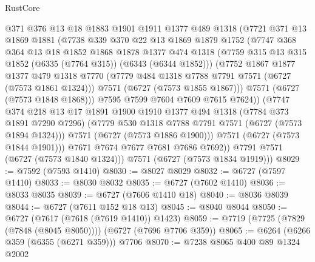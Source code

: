 \begin{lexlean}{RustCore}
\begin{coremodule}
              @371
              @376
              @13
              @18
              @1883
              @1901
              @1911
              @1377
              @489
              @1318
              (@7721
                @371
                @13
                @1869
                @1881
                (@7738
                  @339
                  @370
                  @22
                  @13
                  @1869
                  @1879
                  @1752
                  (@7747
                    @368
                    @364
                    @13
                    @18
                    @1852
                    @1868
                    @1878
                    @1377
                    @474
                    @1318
                    (@7759 @315 @13 @315 @1852 (@6335 (@7764 @315)) (@6343 (@6344 @1852)))
                    (@7752
                      @1867
                      @1877
                      @1377
                      @479
                      @1318
                      @7770
                      (@7779 @484 @1318 @7788 @7791 @7571 (@6727 (@7573 @1861 @1324)))
                      @7571
                      (@6727 (@7573 @1855 @1867)))
                    @7571
                    (@6727 (@7573 @1848 @1868)))
                  @7595
                  @7599
                  @7604
                  @7609
                  @7615
                  @7624))
              (@7747
                @374
                @218
                @13
                @17
                @1891
                @1900
                @1910
                @1377
                @494
                @1318
                (@7784 @373 @1891 @7290 @7296)
                (@7779 @530 @1318 @7788 @7791 @7571 (@6727 (@7573 @1894 @1324)))
                @7571
                (@6727 (@7573 @1886 @1900)))
              @7571
              (@6727 (@7573 @1844 @1901)))
            @7671
            @7674
            @7677
            @7681
            @7686
            @7692))
        @7791
        @7571
        (@6727 (@7573 @1840 @1324)))
      @7571
      (@6727 (@7573 @1834 @1919)))
@8029 := @7592 (@7593 @1410)
@8030 := @8027 @8029
@8032 := @6727 (@7597 @1410)
@8033 := @8030 @8032
@8035 := @6727 (@7602 @1410)
@8036 := @8033 @8035
@8039 := @6727 (@7606 @1410 @18)
@8040 := @8036 @8039
@8044 := @6727 (@7611 @152 @18 @13)
@8045 := @8040 @8044
@8050 := @6727 (@7617 (@7618 (@7619 @1410)) @1423)
@8059 := @7719 (@7725 (@7829 (@7848 (@8045 @8050)))) (@6727 (@7696 @7706 @359))
@8065 := @6264 (@6266 @359 (@6355 (@6271 @359))) @7706
@8070 := @7238 @8065 @400 @89 @1324 @2002

\end{coremodule}
\end{lexlean}
